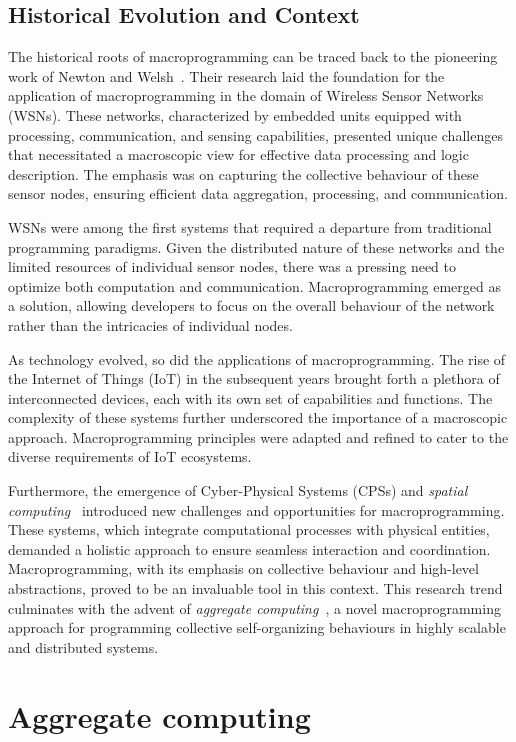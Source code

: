 \subsection{Historical Evolution and Context}
The historical roots of macroprogramming can be traced back to the pioneering work of Newton and Welsh~\cite{newton2004region}. 
 Their research laid the foundation for the application of macroprogramming in the domain of Wireless Sensor Networks (WSNs). 
 These networks, characterized by embedded units equipped with processing, communication, and sensing capabilities, presented unique challenges that necessitated a macroscopic view for effective data processing and logic description. 
The emphasis was on capturing the collective behaviour of these sensor nodes, 
 ensuring efficient data aggregation, processing, and communication.

WSNs were among the first systems that required a departure from traditional programming paradigms. 
 Given the distributed nature of these networks and the limited resources of individual sensor nodes, 
 there was a pressing need to optimize both computation and communication. 
 Macroprogramming emerged as a solution, 
 allowing developers to focus on the overall behaviour of the network rather than the intricacies of individual nodes.

As technology evolved, so did the applications of macroprogramming. 
 The rise of the Internet of Things (IoT) in the subsequent years brought forth a plethora of interconnected devices, each with its own set of capabilities and functions. 
 The complexity of these systems further underscored the importance of a macroscopic approach. Macroprogramming principles were adapted and refined to cater to the diverse requirements of IoT ecosystems.

Furthermore, the emergence of Cyber-Physical Systems (CPSs) and \emph{spatial computing}~\cite{DBLP:journals/corr/abs-1202-5509} introduced new challenges and opportunities for macroprogramming. 
%
These systems, which integrate computational processes with physical entities,
 demanded a holistic approach to ensure seamless interaction and coordination. 
 Macroprogramming, with its emphasis on collective behaviour and high-level abstractions, 
 proved to be an invaluable tool in this context.
%
This research trend culminates with the advent of \emph{aggregate computing}~\cite{aggregatecomputing}, 
 a novel macroprogramming approach for programming collective self-organizing behaviours in highly scalable and distributed systems.
\section{Aggregate computing}


